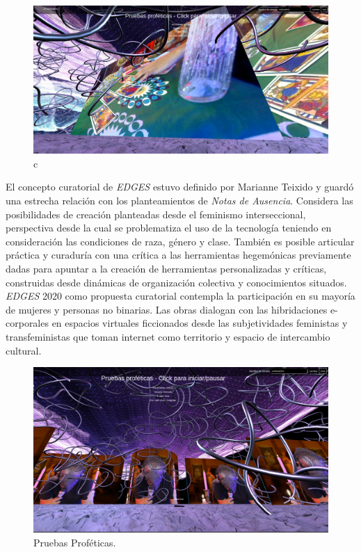 
\begin{figure}
  \includegraphics[width=\textwidth]{img/figura4.png}
  \caption{c}
    \label{fig:pruebas1}

\end{figure}

El concepto curatorial de \emph{EDGES} estuvo definido por Marianne Teixido y guardó una estrecha relación con los planteamientos de \textit{Notas de Ausencia}. Considera las posibilidades de creación planteadas desde el feminismo interseccional, perspectiva desde la cual se problematiza el uso de la tecnología teniendo en consideración las condiciones de raza, género y clase. También es posible articular práctica y curaduría con una crítica a las herramientas hegemónicas previamente dadas para apuntar a la creación de herramientas personalizadas y críticas, construidas desde dinámicas de organización colectiva y conocimientos situados. \emph{EDGES} 2020 como propuesta curatorial contempla la participación en su mayoría de mujeres y personas no binarias. Las obras dialogan con las hibridaciones e-corporales en espacios virtuales ficcionados desde las subjetividades feministas y transfeministas que toman internet como territorio y espacio de intercambio cultural.

\begin{figure}
  \includegraphics[width=\textwidth]{img/figura5.png}
  \caption{Pruebas Proféticas.}
    \label{fig:pruebas2}

\end{figure}
